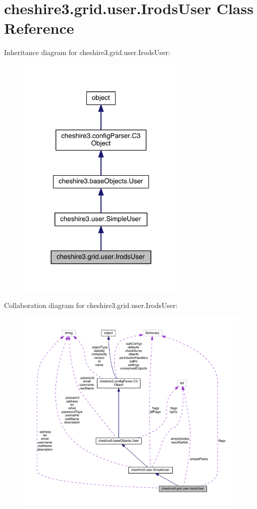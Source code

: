\hypertarget{classcheshire3_1_1grid_1_1user_1_1_irods_user}{\section{cheshire3.\-grid.\-user.\-Irods\-User Class Reference}
\label{classcheshire3_1_1grid_1_1user_1_1_irods_user}
}


Inheritance diagram for cheshire3.\-grid.\-user.\-Irods\-User\-:
\nopagebreak
\begin{figure}[H]
\begin{center}
\leavevmode
\includegraphics[width=228pt]{classcheshire3_1_1grid_1_1user_1_1_irods_user__inherit__graph}
\end{center}
\end{figure}


Collaboration diagram for cheshire3.\-grid.\-user.\-Irods\-User\-:
\nopagebreak
\begin{figure}[H]
\begin{center}
\leavevmode
\includegraphics[width=350pt]{classcheshire3_1_1grid_1_1user_1_1_irods_user__coll__graph}
\end{center}
\end{figure}

